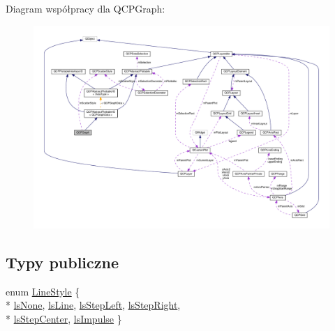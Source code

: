 Diagram współpracy dla Q\+C\+P\+Graph\+:\nopagebreak
\begin{figure}[H]
\begin{center}
\leavevmode
\includegraphics[width=350pt]{class_q_c_p_graph__coll__graph}
\end{center}
\end{figure}
\subsection*{Typy publiczne}
\begin{DoxyCompactItemize}
\item 
enum \hyperlink{class_q_c_p_graph_ad60175cd9b5cac937c5ee685c32c0859}{Line\+Style} \{ \\*
\hyperlink{class_q_c_p_graph_ad60175cd9b5cac937c5ee685c32c0859aea9591b933733cc7b20786b71e60fa04}{ls\+None}, 
\hyperlink{class_q_c_p_graph_ad60175cd9b5cac937c5ee685c32c0859a3c42a27b15aa3c92d399082fad8b7515}{ls\+Line}, 
\hyperlink{class_q_c_p_graph_ad60175cd9b5cac937c5ee685c32c0859ae10568bda57836487d9dec5eba1d6c6e}{ls\+Step\+Left}, 
\hyperlink{class_q_c_p_graph_ad60175cd9b5cac937c5ee685c32c0859a9c37951f7d11aa070100fd16f2935c9e}{ls\+Step\+Right}, 
\\*
\hyperlink{class_q_c_p_graph_ad60175cd9b5cac937c5ee685c32c0859a5adf7b04da215a40a764c21294ea7366}{ls\+Step\+Center}, 
\hyperlink{class_q_c_p_graph_ad60175cd9b5cac937c5ee685c32c0859aa3b358b4ae7cca94aceeb8e529c12ebb}{ls\+Impulse}
 \}
\end{DoxyCompactItemize}
